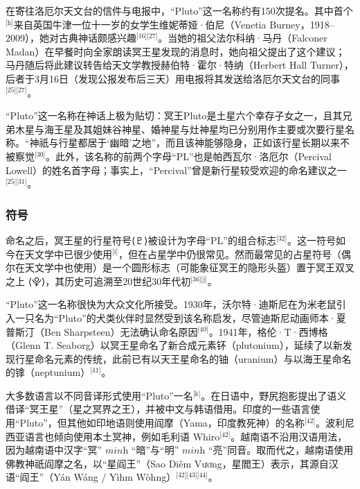 在寄往洛厄尔天文台的信件与电报中，“Pluto”这一名称约有150次提名。其中首个\(^\text{[h]}\)来自英国牛津一位十一岁的女学生维妮蒂娅·伯尼（Venetia Burney，1918–2009），她对古典神话颇感兴趣\(^\text{[16][27]}\)。当她的祖父法尔科纳·马丹（Falconer Madan）在早餐时向全家朗读冥王星发现的消息时，她向祖父提出了这个建议；马丹随后将此建议转告给天文学教授赫伯特·霍尔·特纳（Herbert Hall Turner），后者于3月16日（发现公报发布后三天）用电报将其发送给洛厄尔天文台的同事\(^\text{[25][27]}\)。

“Pluto”这一名称在神话上极为贴切：冥王Pluto是土星六个幸存子女之一，且其兄弟木星与海王星及其姐妹谷神星、婚神星与灶神星均已分别用作主要或次要行星名称。“神祇与行星都居于‘幽暗’之地”，而且该神能够隐身，正如该行星长期以来不被察觉\(^\text{[30]}\)。此外，该名称的前两个字母“PL”也是帕西瓦尔·洛厄尔（Percival Lowell）的姓名首字母；事实上，“Percival”曾是新行星较受欢迎的命名建议之一\(^\text{[25][31]}\)。
\subsubsection{符号}
命名之后，冥王星的行星符号⟨♇⟩被设计为字母“PL”的组合标志\(^\text{[32]}\)。这一符号如今在天文学中已很少使用\(^\text{[i]}\)，但在占星学中仍很常见。然而最常见的占星符号（偶尔在天文学中也使用）是一个圆形标志（可能象征冥王的隐形头盔）置于冥王双叉之上 ⟨⯓⟩，其历史可追溯至20世纪30年代初\(^\text{[36][j]}\)。

“Pluto”这一名称很快为大众文化所接受。1930年，沃尔特·迪斯尼在为米老鼠引入一只名为“Pluto”的犬类伙伴时显然受到该名称启发，尽管迪斯尼动画师本·夏普斯汀（Ben Sharpsteen）无法确认命名原因\(^\text{[40]}\)。1941年，格伦·T·西博格（Glenn T. Seaborg）以冥王星命名了新合成元素钚（plutonium），延续了以新发现行星命名元素的传统，此前已有以天王星命名的铀（uranium）与以海王星命名的镎（neptunium）\(^\text{[41]}\)。

大多数语言以不同音译形式使用“Pluto”一名\(^\text{[k]}\)。在日语中，野尻抱影提出了语义借译“冥王星”（星之冥界之王），并被中文与韩语借用。印度的一些语言使用“Pluto”，但其他如印地语则使用阎摩（Yama，印度教死神）的名称\(^\text{[42]}\)。波利尼西亚语言也倾向使用本土冥神，例如毛利语 Whiro\(^\text{[42]}\)。越南语不沿用汉语用法，因为越南语中汉字“冥” $\textit{minh}$ “暗”与“明” $\textit{minh}$ “亮”同音。取而代之，越南语使用佛教神祇阎摩之名，以“星阎王”（Sao Diêm Vương，星閻王）表示，其源自汉语“阎王”（Yán Wáng / Yìhm Wòhng）\(^\text{[42][43][44]}\)。
